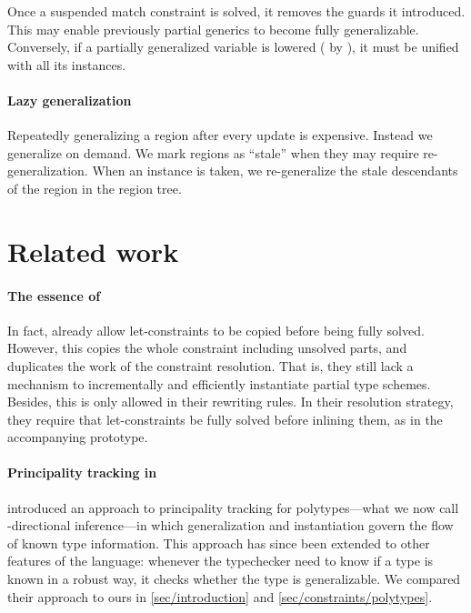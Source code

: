 \documentclass[acmsmall,screen,nonacm,review]{acmart}
\begin{document}
Once a suspended match constraint is solved, it removes the guards it
introduced. This may enable previously partial generics to become fully
generalizable. Conversely, if a partially generalized variable is lowered (\eg
by ), it must be unified with all its instances.

\paragraph{Lazy generalization} Repeatedly generalizing a region after every
update is expensive.  Instead we generalize on demand. We mark regions as
``stale'' when they may require re-generalization. When an instance is taken,
we re-generalize the stale descendants of the region in the region tree.

\section{Related work}
\label{sec:related-work}

\paragraph{The essence of \ML}

In fact, \citet* {Pottier-Remy/emlti} already allow let-constraints to be
copied before being fully solved. However, this copies the whole constraint
including unsolved parts, and duplicates the work of the constraint
resolution.  That is, they still lack a mechanism to incrementally and
efficiently instantiate partial type schemes.  Besides, this is only allowed
in their rewriting rules.  In their resolution strategy, they require that
let-constraints be fully solved before inlining them, as in the accompanying
prototype.




\paragraph{Principality tracking in \OCaml}

\citet*{Garrigue-Remy/poly-ml} introduced an approach to principality tracking
for polytypes---what we now call \geninst-directional inference---in which
generalization and instantiation govern the flow of known type information.
This approach has since been extended to other features of the \OCaml language:
whenever the typechecker need to know if a type is known in a robust way, it
checks whether the type is generalizable. We compared their approach to ours in
\cref{sec/introduction} and \cref{sec/constraints/polytypes}.
\end{document}
